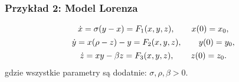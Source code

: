\documentclass[a4paper,12pt,polish]{sphinxmanual}
\begin{document}
\subsubsection{Przykład 2: Model Lorenza}
\label{ch1/chI023:przyklad-2-model-lorenza}\label{ch1/chI023:equation-eqn58}\begin{gather}
\begin{split}\dot x = \sigma (y-x) = F_1(x, y,  z), \qquad x(0) = x_0,\end{split}\label{ch1/chI023-eqn58}\\\begin{split}\dot y = x(\rho - z) -y = F_2(x, y,  z), \qquad y(0) = y_0,\end{split}\notag\\\begin{split}\dot z = x y - \beta z = F_3(x, y,  z), \qquad z(0) = z_0.\end{split}\notag
\end{gather}
gdzie wszystkie parametry są dodatnie: $\sigma, \rho, \beta > 0$.
\end{document}
